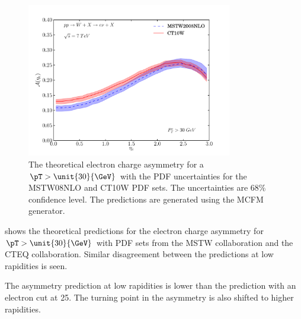 \begin{figure}[htbp]
  \centering
  \includegraphics[width=0.8\textwidth]{asym-uncert-30}
  \caption[The theoretical electron charge asymmetry for a ${\pT>\unit{25}{\GeV}}$
with the {PDF} uncertainties.] {The theoretical electron charge
asymmetry\cite{monchenault2011predictions} for a $\pT>\unit{30}{\GeV}$ with the
{PDF} uncertainties for the MSTW08NLO\cite{martin2009parton} and
CT10W\cite{lai2010vv} {PDF} sets. The uncertainties are $68\%$ confidence level. The
predictions are generated using the {MCFM} \cite{campbellmcfm} generator.}
  \label{fig:asym-uncert-30}
\end{figure}

 shows the theoretical predictions for the
electron charge asymmetry for $\pT>\unit{30}{\GeV}$ with PDF sets from the MSTW
collaboration\cite{martin2009parton} and the CTEQ collaboration\cite{lai2010vv}.
Similar disagreement between the predictions at low rapidities is seen.

The asymmetry prediction at low rapidities is lower than the prediction with an
electron cut at \unit{25}{\GeV}. The turning point in the asymmetry is also
shifted to higher rapidities.



